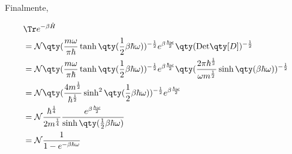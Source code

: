 \documentclass[twoside]{amsart}
\numberwithin{equation}{section}
\newcommand{\Det}[1]{\textup{Det} #1}
\begin{document}
\begin{refsection}
Finalmente,

\begin{align}
    &\Tr e^{-\beta\hat H}\\
    &=\mathcal N\qty(\frac{m\omega}{\pi\hbar}\tanh\qty(\frac12\beta\hbar\omega))^{-\frac12}e^{\beta\frac{\hbar \omega}{2}}\qty(\Det\qty[D])^{-\frac12}\\
    &=\mathcal N\qty(\frac{m\omega}{\pi\hbar}\tanh\qty(\frac12\beta\hbar\omega))^{-\frac12}e^{\beta\frac{\hbar \omega}{2}}\qty(\frac{2\pi\hbar^\frac12}{\omega m^\frac12}\sinh\qty(\beta\hbar\omega))^{-\frac12}\\
    &=\mathcal N\qty(\frac{4m^\frac12}{\hbar^\frac12}\sinh^2\qty(\frac12\beta\hbar\omega))^{-\frac12}e^{\beta\frac{\hbar \omega}{2}}\\
    &=\mathcal N\frac{\hbar^\frac14}{2m^\frac14}\frac{e^{\beta\frac{\hbar \omega}{2}}}{\sinh\qty(\frac12\beta\hbar\omega)}\\
    &=\mathcal N\frac{1}{1-e^{-\beta\hbar\omega}}
\end{align}

\printbibliography[heading=subbibliography]
\end{refsection}

\end{document}
